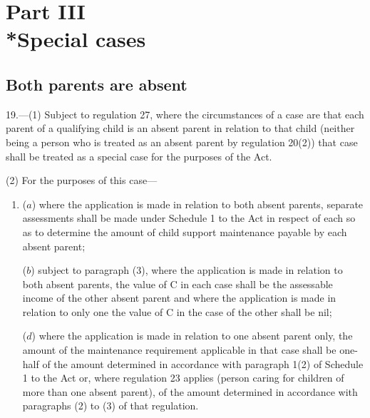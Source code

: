 \documentclass[12pt,a4paper]{article}
\begin{document}
\section[Part III --- Special cases]{Part III\\*Special cases}

\renewcommand\parthead{--- Part III}

\subsection[19. Both parents are absent]{Both parents are absent}

19.—(1) Subject to regulation 27, where the circumstances of a case are that each parent of a qualifying child is an absent parent in relation to that child (neither being a person who is treated as an absent parent by regulation 20(2)) that case shall be treated as a special case for the purposes of the Act.

(2) For the purposes of this case—
\begin{enumerate}\item[]
($a$) where the application is made in relation to both absent parents, separate assessments shall be made under Schedule 1 to the Act in respect of each so as to determine the amount of child support maintenance payable by each absent parent;

($b$) subject to paragraph (3), where the application is made in relation to both absent parents, the value of C in each case shall be the assessable income of the other absent parent and where the application is made in relation to only one the value of C in the case of the other shall be nil;


($d$) where the application is made in relation to one absent parent only, the amount of the maintenance requirement applicable in that case shall be one-half of the amount determined in accordance with paragraph 1(2) of Schedule 1 to the Act or, where regulation 23 applies (person caring for children of more than one absent parent), of the amount determined in accordance with paragraphs (2) to (3) of that regulation.
\end{enumerate}
\end{document}
